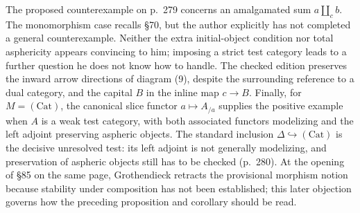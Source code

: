 \documentclass[10pt,oneside]{book}
\begin{document}
The proposed counterexample on p.\ 279 concerns an amalgamated sum $a\amalg_c b$. The monomorphism case recalls \S70, but the author explicitly has not completed a general counterexample. Neither the extra initial-object condition nor total asphericity appears convincing to him; imposing a strict test category leads to a further question he does not know how to handle. The checked edition preserves the inward arrow directions of diagram (9), despite the surrounding reference to a dual category, and the capital $B$ in the inline map $c\to B$. Finally, for $M=(\mathrm{Cat})$, the canonical slice functor $a\mapsto A_{/a}$ supplies the positive example when $A$ is a weak test category, with both associated functors modelizing and the left adjoint preserving aspheric objects. The standard inclusion $\Delta\hookrightarrow(\mathrm{Cat})$ is the decisive unresolved test: its left adjoint is not generally modelizing, and preservation of aspheric objects still has to be checked (p.\ 280). At the opening of \S85 on the same page, Grothendieck retracts the provisional morphism notion because stability under composition has not been established; this later objection governs how the preceding proposition and corollary should be read.
\end{document}
